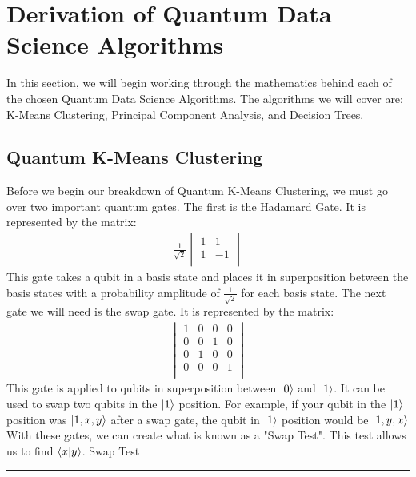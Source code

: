 \documentclass[conference]{IEEEtran}
\begin{document}
\section{Derivation of Quantum Data Science Algorithms}
In this section, we will begin working through the mathematics behind each of the chosen Quantum Data Science Algorithms. The algorithms we will cover are: K-Means Clustering, Principal Component Analysis, and Decision Trees.   
\subsection{Quantum K-Means Clustering}
Before we begin our breakdown of Quantum K-Means Clustering, we must go over two important quantum gates. The first is the Hadamard Gate. It is represented by the matrix:
\begin{align*}
\frac{1}{\sqrt{2}}
    \begin{vmatrix}
    1 & 1 \\
    1 & -1 \\
    \end{vmatrix} 
\end{align*} 
This gate takes a qubit in a basis state and places it in superposition between the basis states with a probability amplitude of $\frac{1}{\sqrt{2}}$ for each basis state. The next gate we will need is the swap gate. It is represented by the matrix: \begin{align*}
    \begin{vmatrix}
    1 & 0 & 0 & 0 \\
    0 & 0 & 1 & 0 \\
    0 & 1 & 0 & 0 \\
    0 & 0 & 0 & 1\\
    \end{vmatrix} 
\end{align*} 
This gate is applied to qubits in superposition between $\ket{0}$ and $\ket{1}$. It can be used to swap two qubits in the $\ket{1}$ position. For example, if your qubit in the $\ket{1}$ position was $\ket{1,x,y}$ after a swap gate, the qubit in $\ket{1}$ position would be $\ket{1,y,x}$ \cite{b5}
\newline
\indent With these gates, we can create what is known as a "Swap Test". This test allows us to find $\bra{x}\ket{y}$. \newline
\newline
{\large Swap Test} \newline
\noindent\rule{\columnwidth}{1pt}
\newline
\end{document}
